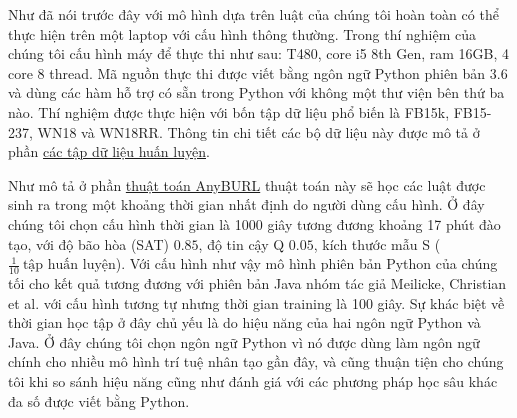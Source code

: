 Như đã nói trước đây với mô hình dựa trên luật của chúng tôi hoàn toàn có thể thực hiện trên một laptop với cấu hình thông thường. Trong thí nghiệm của chúng tôi cấu hình máy để thực thi như sau: T480, core i5 8th Gen, ram 16GB, 4 core 8 thread. Mã nguồn thực thi được viết bằng ngôn ngữ Python phiên bản 3.6 và dùng các hàm hỗ trợ có sẵn trong Python với không một thư viện bên thứ ba nào. Thí nghiệm được thực hiện với bốn tập dữ liệu phổ biến là FB15k, FB15-237, WN18 và WN18RR. Thông tin chi tiết các bộ dữ liệu này được mô tả ở phần \hyperref[datasets]{các tập dữ liệu huấn luyện}.

Như mô tả ở phần \hyperref[algorithm2]{thuật toán AnyBURL} thuật toán này sẽ học các luật được sinh ra trong một khoảng thời gian nhất định do người dùng cấu hình. Ở đây chúng tôi chọn cấu hình thời gian là 1000 giây tương đương khoảng 17 phút đào tạo, với độ bão hòa (SAT) \(0.85\), độ tin cậy Q \(0.05\), kích thước mẫu S (\(\frac{1}{10}~ \text{tập huấn luyện}\)). Với cấu hình như vậy mô hình phiên bản Python của chúng tối cho kết quả tương đương với phiên bản Java nhóm tác giả Meilicke, Christian et al. \cite{burl} với cấu hình tương tự nhưng thời gian training là 100 giây. Sự khác biệt về thời gian học tập ở đây chủ yếu là do hiệu năng của hai ngôn ngữ Python và Java. Ở đây chúng tôi chọn ngôn ngữ Python vì nó được dùng làm ngôn ngữ chính cho nhiều mô hình trí tuệ nhân tạo gần đây, và cũng thuận tiện cho chúng tôi khi so sánh hiệu năng cũng như đánh giá với các phương pháp học sâu khác đa số được viết bằng Python.

